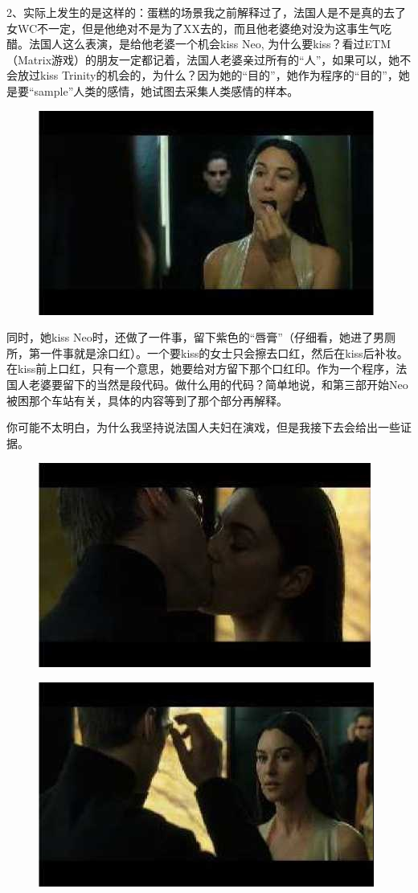 \documentclass{ctexart}
\begin{document}
2、实际上发生的是这样的：蛋糕的场景我之前解释过了，法国人是不是真的去了女WC不一定，但是他绝对不是为了XX去的，而且他老婆绝对没为这事生气吃醋。法国人这么表演，是给他老婆一个机会kiss Neo, 为什么要kiss？看过ETM（Matrix游戏）的朋友一定都记着，法国人老婆亲过所有的“人”，如果可以，她不会放过kiss Trinity的机会的，为什么？因为她的“目的”，她作为程序的“目的”，她是要“sample”人类的感情，她试图去采集人类感情的样本。

\begin{figure}[htb]
\centering
\includegraphics[width=0.5\linewidth]{fig/read_reloaded-104}
\end{figure}

同时，她kiss Neo时，还做了一件事，留下紫色的“唇膏”（仔细看，她进了男厕所，第一件事就是涂口红）。一个要kiss的女士只会擦去口红，然后在kiss后补妆。在kiss前上口红，只有一个意思，她要给对方留下那个口红印。作为一个程序，法国人老婆要留下的当然是段代码。做什么用的代码？简单地说，和第三部开始Neo被困那个车站有关，具体的内容等到了那个部分再解释。

你可能不太明白，为什么我坚持说法国人夫妇在演戏，但是我接下去会给出一些证据。

\begin{figure}[htb]
\centering
\includegraphics[width=0.5\linewidth]{fig/read_reloaded-105}
\end{figure}

\begin{figure}[htb]
\centering
\includegraphics[width=0.5\linewidth]{fig/read_reloaded-106}
\end{figure}
\end{document}
